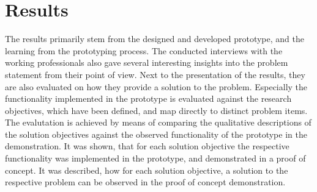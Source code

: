 \chapter{Results}




The results primarily stem from the designed and developed prototype,
and the learning from the prototyping process.
The conducted interviews with the working professionals also gave several interesting insights into
the problem statement from their point of view.
Next to the presentation of the results, they are also evaluated on how they provide a solution
to the problem.
Especially the functionality implemented in the prototype is evaluated against the research objectives,
which have been defined, and map directly to distinct problem items.
The evalutation is achieved by means of
comparing the qualitative descriptions of the solution objectives against the
observed functionality of the prototype in the demonstration.
%
It was shown, that for each solution objective
the respective functionality was implemented in the prototype,
and demonstrated in a proof of concept.
It was described, how for each solution objective,
a solution to the respective problem can be observed in the
proof of concept demonstration.



